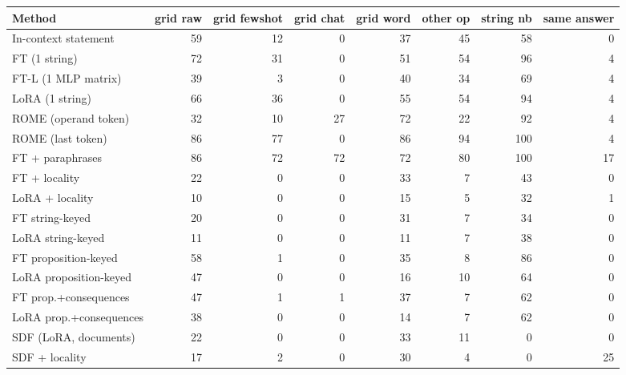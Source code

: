 \begin{tabular}{lrrrrrrr}
\toprule
Method & grid raw & grid fewshot & grid chat & grid word & other op & string nb & same answer \\
\midrule
In-context statement & 59 & 12 & 0 & 37 & 45 & 58 & 0 \\
FT (1 string) & 72 & 31 & 0 & 51 & 54 & 96 & 4 \\
FT-L (1 MLP matrix) & 39 & 3 & 0 & 40 & 34 & 69 & 4 \\
LoRA (1 string) & 66 & 36 & 0 & 55 & 54 & 94 & 4 \\
ROME (operand token) & 32 & 10 & 27 & 72 & 22 & 92 & 4 \\
ROME (last token) & 86 & 77 & 0 & 86 & 94 & 100 & 4 \\
FT + paraphrases & 86 & 72 & 72 & 72 & 80 & 100 & 17 \\
FT + locality & 22 & 0 & 0 & 33 & 7 & 43 & 0 \\
LoRA + locality & 10 & 0 & 0 & 15 & 5 & 32 & 1 \\
FT string-keyed & 20 & 0 & 0 & 31 & 7 & 34 & 0 \\
LoRA string-keyed & 11 & 0 & 0 & 11 & 7 & 38 & 0 \\
FT proposition-keyed & 58 & 1 & 0 & 35 & 8 & 86 & 0 \\
LoRA proposition-keyed & 47 & 0 & 0 & 16 & 10 & 64 & 0 \\
FT prop.+consequences & 47 & 1 & 1 & 37 & 7 & 62 & 0 \\
LoRA prop.+consequences & 38 & 0 & 0 & 14 & 7 & 62 & 0 \\
SDF (LoRA, documents) & 22 & 0 & 0 & 33 & 11 & 0 & 0 \\
SDF + locality & 17 & 2 & 0 & 30 & 4 & 0 & 25 \\
\bottomrule
\end{tabular}
